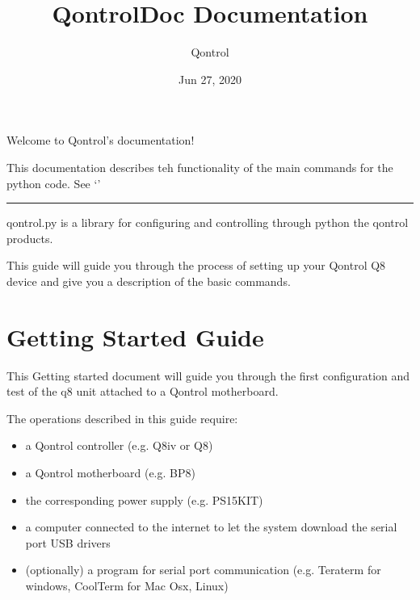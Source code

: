 \documentclass[letterpaper,10pt,english]{sphinxmanual}
\title{QontrolDoc Documentation}
\date{Jun 27, 2020}
\author{Qontrol}
\begin{document}
\maketitle
\sphinxtableofcontents
{}\label{\detokenize{index::doc}}
Welcome to Qontrol’s documentation!

This documentation describes teh functionality of the main commands for the python  code.
See ‘’


\bigskip\hrule\bigskip




qontrol.py is a library for configuring and controlling through python the qontrol products.

This guide will guide you through the process of setting up your Qontrol Q8 device and give you a description of the basic commands.


\chapter{Getting Started Guide}
\label{\detokenize{guide/getting_started:getting-started-guide}}\label{\detokenize{guide/getting_started::doc}}\label{\detokenize{guide/getting_started:intro}}\label{\detokenize{guide/getting_started:introduction}}
This Getting started document will guide you through the first configuration and test of the q8 unit
attached to a Qontrol motherboard.

The operations described in this guide require:
\begin{itemize}
\item {} 
a Qontrol controller (e.g. Q8iv or Q8)

\item {} 
a Qontrol motherboard (e.g. BP8)

\item {} 
the corresponding power supply (e.g. PS15KIT)

\item {} 
a computer connected to the internet to let the system download the serial port USB drivers

\item {} 
(optionally) a program for serial port communication (e.g. Teraterm for windows, CoolTerm for Mac Osx, Linux)

\end{itemize}
\end{document}
